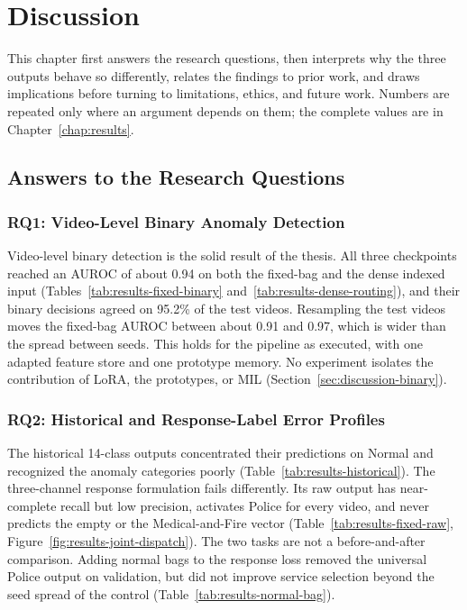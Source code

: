 \chapter{Discussion}
\label{chap:discussion}

This chapter first answers the research questions, then interprets why the
three outputs behave so differently, relates the findings to prior work, and
draws implications before turning to limitations, ethics, and future work.
Numbers are repeated only where an argument depends on them; the complete values
are in Chapter~\ref{chap:results}.

\section{Answers to the Research Questions}
\label{sec:discussion-rq-answers}

\subsection{RQ1: Video-Level Binary Anomaly Detection}
\label{sec:discussion-rq1}

Video-level binary detection is the solid result of the thesis. All three
checkpoints reached an AUROC of about 0.94 on both the fixed-bag and the dense
indexed input (Tables~\ref{tab:results-fixed-binary}
and~\ref{tab:results-dense-routing}), and their binary decisions agreed on
95.2\% of the test videos. Resampling the test videos moves the fixed-bag
AUROC between about 0.91 and 0.97, which is wider than the spread between seeds.
This holds for the pipeline as executed, with one adapted feature store and one prototype memory. No experiment isolates the contribution of LoRA, the prototypes, or MIL (Section~\ref{sec:discussion-binary}).

\subsection{RQ2: Historical and Response-Label Error Profiles}
\label{sec:discussion-rq2}

The historical 14-class outputs concentrated their predictions on Normal and
recognized the anomaly categories poorly (Table~\ref{tab:results-historical}).
The three-channel response formulation fails differently. Its raw output has
near-complete recall but low precision, activates Police for every video, and
never predicts the empty or the Medical-and-Fire vector
(Table~\ref{tab:results-fixed-raw}, Figure~\ref{fig:results-joint-dispatch}).
The two tasks are not a before-and-after comparison. Adding normal bags to the
response loss removed the universal Police output on validation, but did not
improve service selection beyond the seed spread of the control
(Table~\ref{tab:results-normal-bag}).

